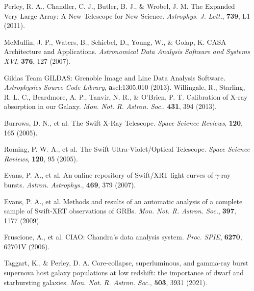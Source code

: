\documentclass{nature_plusfigure}
\newcommand{\mn}{{Mon. Not. R. Astron. Soc.}}
\newcommand{\mnras}{\mn}
\newcommand{\apjl}{{Astrophys. J. Lett.}}
\newcommand{\aap}{{Astron. Astrophys.}}
\newcommand{\procspie}{Proc. SPIE}
\newcommand{\ssr}{Space Science Reviews}
\begin{document}
\begin{methods}
\begin{thebibliography}{10}
 Perley, R. A., Chandler, C. J., Butler, B. J., \& Wrobel, J. M. The Expanded Very Large Array: A New Telescope for New Science. \emph{\apjl}, \textbf{739}, L1 (2011). 

 McMullin, J. P., Waters, B., Schiebel, D., Young, W., \& Golap, K. CASA Architecture and Applications. \emph{Astronomical Data Analysis Software and Systems XVI}, \textbf{376}, 127 (2007). 

 Gildas Team GILDAS: Grenoble Image and Line Data Analysis Software. \emph{Astrophysics Source Code Library}, \textbf ascl:1305.010 (2013). 
 Willingale, R., Starling, R. L. C., Beardmore, A. P., Tanvir, N. R., \& O'Brien, P. T. Calibration of X-ray absorption in our Galaxy. \emph{\mnras}, \textbf{431}, 394 (2013). 


 Burrows, D. N., et al. The Swift X-Ray Telescope. \emph{\ssr}, \textbf{120}, 165 (2005). 

 Roming, P. W. A., et al. The Swift Ultra-Violet/Optical Telescope. \emph{\ssr}, \textbf{120}, 95 (2005).

 Evans, P. A., et al. An online repository of Swift/XRT light curves of $\gamma$-ray bursts. \emph{\aap}, \textbf{469}, 379 (2007). 

 Evans, P. A., et al. Methods and results of an automatic analysis of a complete sample of Swift-XRT observations of GRBs. \emph{\mnras}, \textbf{397}, 1177 (2009). 

 Fruscione, A., et al. CIAO: Chandra's data analysis system. \emph{\procspie}, \textbf{6270}, 62701V (2006). 


 Taggart, K., \& Perley, D. A. Core-collapse, superluminous, and gamma-ray burst supernova host galaxy populations at low redshift: the importance of dwarf and starbursting galaxies. \emph{\mnras}, \textbf{503}, 3931 (2021). 

\end{thebibliography}

\end{methods}

\clearpage
\end{document}
